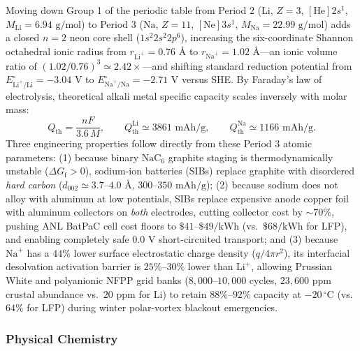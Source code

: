 \documentclass{article}
\newcounter{subsubsubsection}[subsubsection]
\begin{document}
Moving down Group 1 of the periodic table from Period 2 ($\text{Li}$, $Z = 3$, $[\text{He}]2s^1$, $M_{\text{Li}} = 6.94\text{ g/mol}$) to Period 3 ($\text{Na}$, $Z = 11$, $[\text{Ne}]3s^1$, $M_{\text{Na}} = 22.99\text{ g/mol}$) adds a closed $n=2$ neon core shell ($1s^2 2s^2 2p^6$), increasing the six-coordinate Shannon octahedral ionic radius from $r_{\text{Li}^+} = 0.76\text{ \AA}$ to $r_{\text{Na}^+} = 1.02\text{ \AA}$---an ionic volume ratio of $(1.02 / 0.76)^3 \simeq 2.42\times$---and shifting standard reduction potential from $E^\circ_{\text{Li}^+/\text{Li}} = -3.04\text{ V}$ to $E^\circ_{\text{Na}^+/\text{Na}} = -2.71\text{ V}$ versus SHE. By Faraday's law of electrolysis, theoretical alkali metal specific capacity scales inversely with molar mass:
\begin{equation}
Q_{\text{th}} = \frac{nF}{3.6\,M}, \qquad
Q_{\text{th}}^{\text{Li}} \simeq 3861\text{ mAh/g}, \qquad
Q_{\text{th}}^{\text{Na}} \simeq 1166\text{ mAh/g}.
\label{eq:mm-sodium-faraday}
\end{equation}
Three engineering properties follow directly from these Period 3 atomic parameters: (1) because binary $\text{NaC}_6$ graphite staging is thermodynamically unstable ($\Delta G_{\text{f}} > 0$), sodium-ion batteries (SIBs) replace graphite with disordered \textit{hard carbon} ($d_{002} \simeq 3.7$--$4.0\text{ \AA}$, $300$--$350\text{ mAh/g}$); (2) because sodium does not alloy with aluminum at low potentials, SIBs replace expensive anode copper foil with aluminum collectors on \textit{both} electrodes, cutting collector cost by $\sim 70\%$, pushing ANL BatPaC cell cost floors to $\$41$--$\$49/\text{kWh}$ (vs.\ $\$68/\text{kWh}$ for LFP), and enabling completely safe $0.0\text{ V}$ short-circuited transport; and (3) because $\text{Na}^+$ has a $44\%$ lower surface electrostatic charge density ($q / 4\pi r^2$), its interfacial desolvation activation barrier is $25\%$--$30\%$ lower than $\text{Li}^+$, allowing Prussian White and polyanionic NFPP grid banks ($8{,}000$--$10{,}000$ cycles, $23{,}600\text{ ppm}$ crustal abundance vs.\ $20\text{ ppm}$ for $\text{Li}$) to retain $88\%$--$92\%$ capacity at $-20\,^\circ\text{C}$ (vs.\ $64\%$ for LFP) during winter polar-vortex blackout emergencies.

\subsubsection{Physical Chemistry}\label{sec:physical-chemistry}
\end{document}
